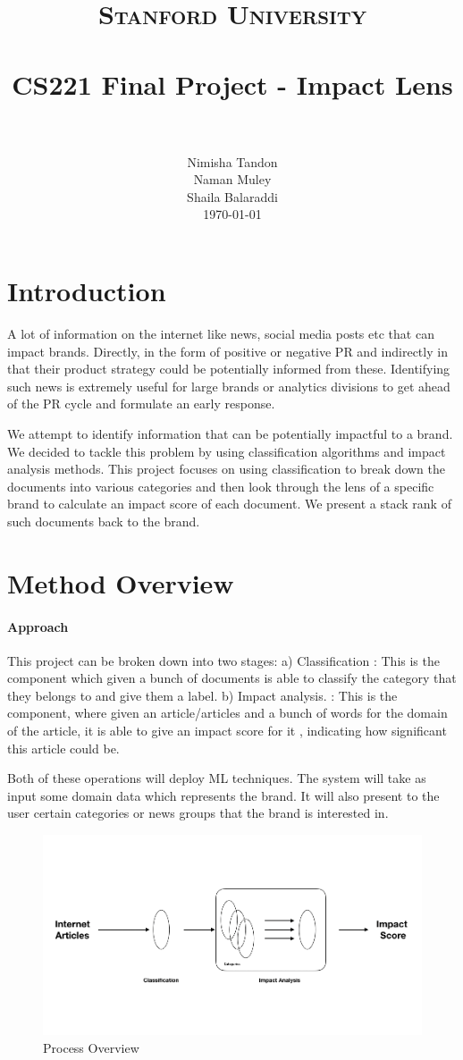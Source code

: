 \documentclass[paper=a4, fontsize=11pt]{scrartcl}
\title{
		\usefont{OT1}{bch}{b}{n}
		\normalfont \normalsize \textsc{Stanford University} \\ [25pt]
		\horrule{0.5pt} \\[0.4cm]
		\huge CS221 Final Project - Impact Lens \\
		\horrule{2pt} \\[0.5cm]
}
\author{
		\normalfont 								\normalsize
        Nimisha Tandon\\[-3pt]		\normalsize
        Naman Muley\\[-3pt]		\normalsize
        Shaila Balaraddi\\[-3pt]		\normalsize
        \today
}
\date{}
\numberwithin{equation}{section}		%
\numberwithin{figure}{section}			%
\numberwithin{table}{section}				%
\begin{document}
\maketitle
\section{Introduction}
A lot of information on the internet like news, social media posts etc that can impact brands. Directly, in the form of positive or negative PR and indirectly in that their product strategy could be potentially informed from these. Identifying such news is extremely useful for large brands or analytics divisions to get ahead of the PR cycle and formulate an early response.

\par We attempt to identify information that can be potentially impactful to a brand. We decided to tackle this problem by using classification algorithms and impact analysis methods. This project focuses on using classification to break down the documents into various categories and then look through the lens of a specific brand to calculate an impact score of each document. We present a stack rank of such documents back to the brand.

\section{Method Overview}
\paragraph{Approach}
This project can be broken down into two stages: 
a) Classification : This is the component which given a bunch of documents is able to classify the category that they belongs to and give them a label.
b) Impact analysis. : This is the component, where given  an article/articles and a bunch of  words for the domain of the article, it is able to give an impact score for it , indicating how significant this article could be. 

Both of these operations will deploy ML techniques. The system will take as input some domain data which represents the brand. It will also present to the user certain categories or news groups that the brand is interested in.

\begin{figure}
	\centering
 	 \includegraphics[width=0.6\linewidth]{impact_score.png}
	  \caption{Process Overview}
 	 \label{fig:Impact Potential}
\end{figure}
\end{document}

